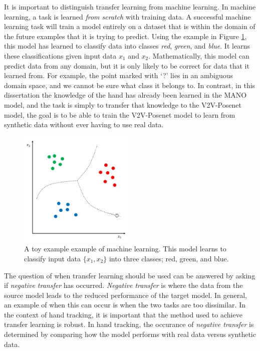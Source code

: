 It is important to distinguish transfer learning from machine learning. In machine learning, a task is learned {\slshape from scratch} with training data. A successful machine learning task will train a model entirely on a dataset that is within the domain of the future examples that it is trying to predict. Using the example in Figure \ref{fig:mlex}, this model has learned to classify data into classes {\slshape red}, {\slshape green}, and {\slshape blue}. It learns these classifications given input data $x_1$ and $x_2$. Mathematically, this model can predict data from any domain, but it is only likely to be correct for data that it learned from. For example, the point marked with `?' lies in an ambiguous domain space, and we cannot be sure what class it belongs to. In contrast, in this dissertation the knowledge of the hand has already been learned in the MANO model, and the task is simply to transfer that knowledge to the V2V-Posenet model, the goal is to be able to train the V2V-Posenet model to learn from synthetic data without ever having to use real data.

\begin{figure}[H]
    \centering
\includegraphics[width=210px]{figs/general/ml_example.pdf}
\caption{A toy example example of machine learning. This model learns to classify input data $\{x_1, x_2\}$ into three classes; red, green, and blue.}
\label{fig:mlex}
\end{figure}

The question of when transfer learning should be used can be answered by asking if {\slshape negative transfer} has occurred. {\slshape Negative transfer} is where the data from the source model leads to the reduced performance of the target model. In general, an example of when this can occur is when the two tasks are too dissimilar. In the context of hand tracking, it is important that the method used to achieve transfer learning is robust. In hand tracking, the occurance of {\slshape negative transfer} is determined by comparing how the model performs with real data versus synthetic data.

